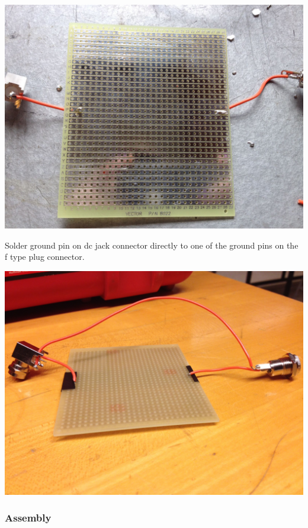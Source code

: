 \documentclass[11pt]{article} %
\begin{document}
\begin{center}
\includegraphics[scale=0.20]{lnainterface/03.jpeg}
\end{center}

Solder ground pin on dc jack connector directly to one of the ground pins on the f type plug connector. 

\begin{center}
\includegraphics[scale=0.20]{lnainterface/04.jpeg}
\end{center}

\subsubsection{Assembly}
\end{document}
